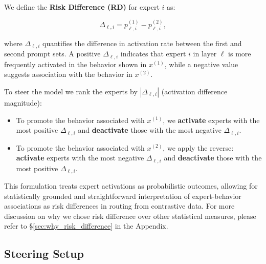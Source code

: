 \documentclass{article} %
\newcommand{\ryan}[1]{\textcolor{blue}{{\bf Ryan:}~#1}}
\newcommand{\hanieh}[1]{\textcolor{magenta}{{\bf Hanieh:}~#1}}
\begin{document}
We define the \textbf{Risk Difference (RD)} for expert $i$ as:

\vspace{-0.1in}
\begin{equation}
\Delta_{\ell, i} = p^{(1)}_{\ell, i} - p^{(2)}_{\ell, i},
\label{eq:expert_rd_score}
\end{equation}

where $\Delta_{\ell, i}$ quantifies the difference in activation rate between the first and second prompt sets. A positive $\Delta_{\ell, i}$ indicates that expert $i$ in layer $\ell$ is more frequently activated in the behavior shown in $x^{(1)}$, while a negative value suggests association with the behavior in $x^{(2)}$.

To steer the model we rank the experts by $|\Delta_{\ell, i}|$ (activation difference magnitude):

\begin{itemize}
\item To promote the behavior associated with $x^{(1)}$, we \textbf{activate} experts with the most positive $\Delta_{\ell, i}$ and \textbf{deactivate} those with the most negative $\Delta_{\ell, i}$.
\item To promote the behavior associated with $x^{(2)}$, we apply the reverse: \textbf{activate} experts with the most negative $\Delta_{\ell, i}$ and \textbf{deactivate} those with the most positive $\Delta_{\ell, i}$.
\end{itemize}

This formulation treats expert activations as probabilistic outcomes, allowing for statistically grounded and straightforward interpretation of expert-behavior associations as risk differences in routing from contrastive data.
For more discussion on why we chose risk difference over other statistical measures, please refer to \S\ref{sec:why_risk_difference} in the Appendix.







\subsection{Steering Setup} 
\end{document}
